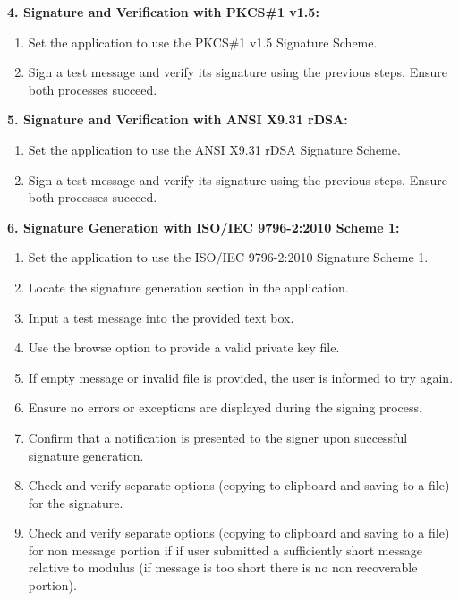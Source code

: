 \documentclass[]{final_report}
\theoremstyle{definition}
\begin{document}
\textbf{4. Signature and Verification with PKCS\#1 v1.5:}
\begin{enumerate}
\item Set the application to use the PKCS\#1 v1.5 Signature Scheme.
\item Sign a test message and verify its signature using the previous steps. Ensure both processes succeed.
\end{enumerate}

\textbf{5. Signature and Verification with ANSI X9.31 rDSA:}
\begin{enumerate}
\item Set the application to use the ANSI X9.31 rDSA Signature Scheme.
\item Sign a test message and verify its signature using the previous steps. Ensure both processes succeed.
\end{enumerate}

\textbf{6. Signature Generation with ISO/IEC 9796-2:2010 Scheme 1:}
\begin{enumerate}
\item Set the application to use the ISO/IEC 9796-2:2010 Signature Scheme 1.
\item Locate the signature generation section in the application.
\item Input a test message into the provided text box. 
\item Use the browse option to provide a valid private key file.
\item If empty message or invalid file is provided, the user is informed to try again. 
\item Ensure no errors or exceptions are displayed during the signing process.
\item Confirm that a notification is presented to the signer upon successful signature generation.
\item Check and verify separate options (copying to clipboard and saving to a file) for the signature.
\item Check and verify separate options (copying to clipboard and saving to a file) for non message portion if if user submitted a sufficiently short message relative to modulus (if message is too short there is no non recoverable portion).
\end{enumerate}
\end{document}
